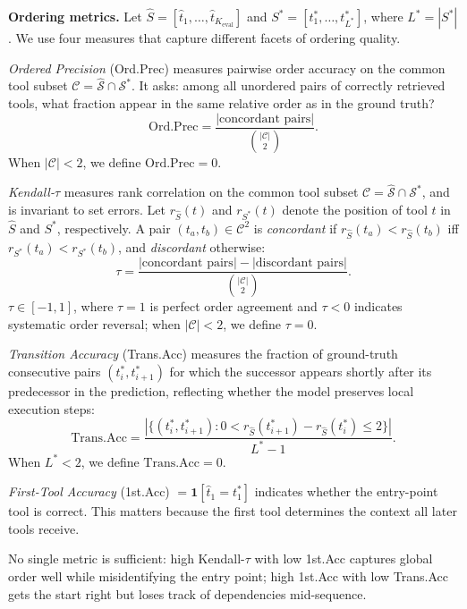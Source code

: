 \documentclass[lettersize,journal]{IEEEtran}
\begin{document}
\textbf{Ordering metrics.}
Let $\hat{S} = [\hat{t}_1, \ldots, \hat{t}_{K_{\mathrm{eval}}}]$ and $S^* = [t_1^*, \ldots, t_{L^*}^*]$, where $L^* = |S^*|$.
We use four measures that capture different facets of ordering quality.

\emph{Ordered Precision} (Ord.Prec) measures pairwise order accuracy on the common tool subset $\mathcal{C} = \hat{\mathcal{S}} \cap \mathcal{S}^*$.
It asks: among all unordered pairs of correctly retrieved tools, what fraction appear in the same relative order as in the ground truth?
\begin{equation}
\text{Ord.Prec}
= \frac{|\text{concordant pairs}|}{\binom{|\mathcal{C}|}{2}}.
\label{eq:ord_prec}
\end{equation}
When $|\mathcal{C}| < 2$, we define $\text{Ord.Prec} = 0$.

\emph{Kendall-$\tau$} measures rank correlation on the common tool subset $\mathcal{C} = \hat{\mathcal{S}} \cap \mathcal{S}^*$, and is invariant to set errors.
Let $r_{\hat{S}}(t)$ and $r_{S^*}(t)$ denote the position of tool $t$ in $\hat{S}$ and $S^*$, respectively.
A pair $(t_a, t_b) \in \mathcal{C}^2$ is \emph{concordant} if $r_{\hat{S}}(t_a) < r_{\hat{S}}(t_b)$ iff $r_{S^*}(t_a) < r_{S^*}(t_b)$, and \emph{discordant} otherwise:
\begin{equation}
\tau = \frac{|\text{concordant pairs}| - |\text{discordant pairs}|}{\binom{|\mathcal{C}|}{2}}.
\label{eq:kendall}
\end{equation}
$\tau \in [-1, 1]$, where $\tau = 1$ is perfect order agreement and $\tau < 0$ indicates systematic order reversal; when $|\mathcal{C}| < 2$, we define $\tau = 0$.

\emph{Transition Accuracy} (Trans.Acc) measures the fraction of ground-truth consecutive pairs $(t_i^*, t_{i+1}^*)$ for which the successor appears shortly after its predecessor in the prediction, reflecting whether the model preserves local execution steps:
\begin{equation}
\text{Trans.Acc} =
\frac{|\{(t_i^*, t_{i+1}^*) : 0 < r_{\hat{S}}(t_{i+1}^*) - r_{\hat{S}}(t_i^*) \le 2\}|}{L^* - 1}.
\label{eq:transacc}
\end{equation}
When $L^* < 2$, we define $\text{Trans.Acc} = 0$.

\emph{First-Tool Accuracy} (1st.Acc) $= \mathbf{1}[\hat{t}_1 = t_1^*]$ indicates whether the entry-point tool is correct.
This matters because the first tool determines the context all later tools receive.

No single metric is sufficient: high Kendall-$\tau$ with low 1st.Acc captures global order well while misidentifying the entry point; high 1st.Acc with low Trans.Acc gets the start right but loses track of dependencies mid-sequence.
\end{document}
